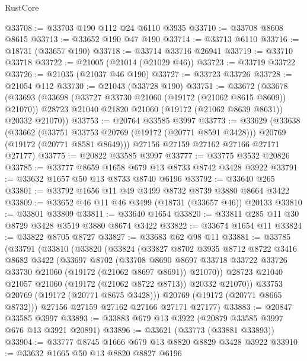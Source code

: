 \begin{lexlean}{RustCore}
\begin{coremodule}
@33708 := @33703 @190 @112 @24 @6110 @3935
@33710 := @33708 @8608 @8615
@33713 := @33652 @190 @47 @190
@33714 := @33713 @6110
@33716 := @18731 (@33657 @190)
@33718 := @33714 @33716 @26941
@33719 := @33710 @33718
@33722 := @21005 (@21014 (@21029 @46))
@33723 := @33719 @33722
@33726 := @21035 (@21037 @46 @190)
@33727 := @33723 @33726
@33728 := @21054 @112
@33730 := @21043 (@33728 @190)
@33751 := @33672
    (@33678
      (@33693
        (@33698 (@33727 @33730 @21060 (@19172 (@21062 @8615 @8609)) @21070))
        @28723
        @21040
        @21820
        @21060
        (@19172 (@21062 @8639 @8631))
        @20332
        @21070))
@33753 := @20764 @33585 @3997
@33773 := @33629
    (@33638
      (@33662
        (@33751 @33753 @20769 (@19172 (@20771 @8591 @3428)))
        @20769
        (@19172 (@20771 @8581 @8649)))
      @27156
      @27159
      @27162
      @27166
      @27171
      @27177)
@33775 := @20822 @33585 @3997
@33777 := @33775 @3532 @20826
@33785 := @33777 @8659 @1658 @679 @13 @8733 @8742 @3428 @3922
@33791 := @33632 @1657 @50 @13 @8733 @8740 @6196
@33792 := @33640 @265
@33801 := @33792 @1656 @11 @49 @3499 @8732 @8739 @3880 @8664 @3422
@33809 := @33652 @46 @11 @46 @3499 (@18731 (@33657 @46)) @20133
@33810 := @33801 @33809
@33811 := @33640 @1654
@33820 := @33811 @285 @11 @30 @8729 @3428 @3519 @3880 @8674 @3422
@33822 := @33674 @1654 @11
@33824 := @33822 @8705 @8727
@33827 := @33683 @62 @98 @11
@33881 := @33785
    (@33791
      (@33810
        (@33820
          (@33824
            (@33827
              @8702
              @3935
              @8712
              @8722
              @3416
              @8682
              @3422
              (@33697
                @8702
                (@33708
                  @8690
                  @8697
                  @33718
                  @33722
                  @33726
                  @33730
                  @21060
                  (@19172 (@21062 @8697 @8691))
                  @21070))
              @28723
              @21040
              @21057
              @21060
              (@19172 (@21062 @8722 @8713))
              @20332
              @21070))
          @33753
          @20769
          (@19172 (@20771 @8675 @3428)))
        @20769
        (@19172 (@20771 @8665 @8732)))
      @27156
      @27159
      @27162
      @27166
      @27171
      @27177)
@33883 := @20847 @33585 @3997
@33893 := @33883 @679 @13 @3922 (@20879 @33585 @3997 @676 @13 @3921 @20891)
@33896 := @33621 (@33773 (@33881 @33893))
@33904 := @33777 @8745 @1666 @679 @13 @8820 @8829 @3428 @3922
@33910 := @33632 @1665 @50 @13 @8820 @8827 @6196

\end{coremodule}
\end{lexlean}
